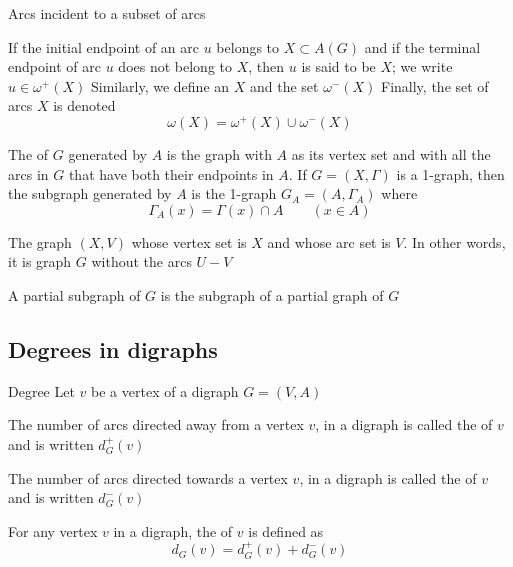 \documentclass[aspectratio=43]{beamer}
\begin{document}
\begin{frame}{Arcs incident to a subset of arcs}
	\begin{definition}
		If the initial endpoint of an arc $u$ belongs to $X\subset A(G)$ and if the terminal endpoint of arc $u$ does not belong to $X$, then $u$ is said to be  $X$; we write $u\in\omega^+(X)$
		\vskip0.2cm
		Similarly, we define an  $X$ and the set $\omega^-(X)$
		\vskip0.2cm
		Finally, the set of arcs  $X$ is denoted
		\[
		\omega(X) = \omega^+(X)\cup\omega^-(X)
		\]
	\end{definition}
\end{frame}

\begin{frame}
	\begin{definition}
		The  of $G$ generated by $A$ is the graph with $A$ as its vertex set and with all the arcs in $G$ that have both their endpoints in $A$. If $G=(X,\Gamma)$ is a 1-graph, then the subgraph generated by $A$ is the 1-graph $G_A=(A,\Gamma_A)$ where
		\[
		\Gamma_A(x)=\Gamma(x)\cap A\qquad (x\in A)
		\]
	\end{definition}
	\vfill
	\begin{definition}
		\label{def:partial_graph}
		The graph $(X,V)$ whose vertex set is $X$ and whose arc set is $V$. 
		In other words, it is graph $G$ without the arcs $U-V$
	\end{definition}
	\vfill
	\begin{definition}
		A partial subgraph of $G$ is the subgraph of a partial graph of $G$
	\end{definition}
\end{frame}



\subsection{Degrees in digraphs}
\begin{frame}{Degree}
	Let $v$ be a vertex of a digraph $G=(V,A)$
	\begin{definition}
	The number of arcs directed away from a vertex $v$, in a digraph is called the  of $v$ and is written $d^+_G(v)$
	\end{definition}
	\begin{definition}
	The number of arcs directed towards a vertex $v$, in a digraph is called the  of $v$ and is written $d^-_G(v)$
	\end{definition}
	\begin{definition}[{Degree}]
	For any vertex $v$ in a digraph, the  of $v$ is defined as 
	\[
		d_G(v)=d^+_G(v)+d^-_G(v)
	\]
	\end{definition}
\end{frame}
\end{document}
